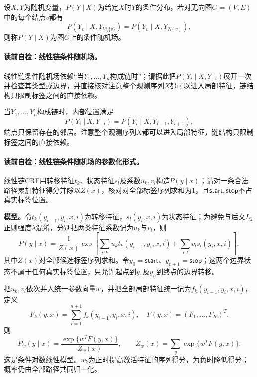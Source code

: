 \begin{definition}[条件随机场]\label{def:V3-C06-crf}
设$X,Y$为随机变量，$P(Y\mid X)$为给定$X$时$Y$的条件分布。若对无向图$G=(V,E)$中的每个结点$v$都有
\[
P(Y_v\mid X,Y_{V\setminus\{v\}})
=P(Y_v\mid X,Y_{N(v)}),
\]
则称$P(Y\mid X)$为图$G$上的条件随机场。
\end{definition}

\paragraph{读前自检：线性链条件随机场。}线性链条件随机场依赖“当$Y_1,\ldots,Y_n$构成链时”；请据此把$P(Y_i\mid X,Y_{-i})$展开一次并检查其类型或边界，并直接核对注意整个观测序列$X$都可以进入局部特征，链结构只限制标签之间的直接依赖。\par

当$Y_1,\ldots,Y_n$构成链时，内部位置满足
\[
P(Y_i\mid X,Y_{-i})
=P(Y_i\mid X,Y_{i-1},Y_{i+1}),
\]
端点只保留存在的邻居。注意整个观测序列$X$都可以进入局部特征，链结构只限制标签之间的直接依赖。

\paragraph{读前自检：线性链条件随机场的参数化形式。}线性链CRF用转移特征$t_k$、状态特征$s_l$及系数$u_k,v_l$构造$P(y\mid x)$；请对一条合法路径累加特征得分并除以$Z(x)$，核对对全部标签序列求和为1，且$\mathsf{start},\mathsf{stop}$不占真实标签位置。\par

\label{struct:V3-C06-CH08}
\textbf{模型。}令$t_k(y_{i-1},y_i,x,i)$为转移特征，$s_l(y_i,x,i)$为状态特征；为避免与后文$L_2$正则强度$\lambda$混淆，分别把两类特征系数记为$u_k$与$v_l$，则
\[
P(y\mid x)=\frac1{Z(x)}\exp\!\left[
\sum_{i,k}u_k t_k(y_{i-1},y_i,x,i)
+\sum_{i,l}v_l s_l(y_i,x,i)\right],
\]
其中$Z(x)$对全部候选标签序列求和。令$y_0=\mathsf{start}$、$y_{n+1}=\mathsf{stop}$；这两个边界状态不属于任何真实标签位置，只允许起点到$y_1$及$y_n$到终点的边界转移。

把$u_k,v_l$依次并入统一参数向量$w$，并把全部局部特征统一记为$f_k(y_{i-1},y_i,x,i)$，定义
\[
F_k(y,x)=\sum_{i=1}^{n+1}f_k(y_{i-1},y_i,x,i),
\quad F(y,x)=(F_1,\ldots,F_K)^T.
\]
则
\[
P_w(y\mid x)=\frac{\exp\{w^TF(y,x)\}}{Z_w(x)},
\qquad Z_w(x)=\sum_y\exp\{w^TF(y,x)\}.
\]
这是条件对数线性模型。$w_k$为正时提高激活特征的序列得分，为负时降低得分；概率仍由全部路径共同归一化。


